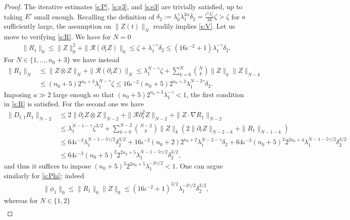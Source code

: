 \documentclass[10pt,a4paper]{amsart}
\begin{document}
\begin{proof}
The iterative estimates \eqref{s:P}, \eqref{s:g3}, and \eqref{s:e3} are trivially satisfied, up to taking $E'$ small enough. 
Recalling the definition of $\delta_2 := \lambda_0^\gamma \lambda_1^{2\alpha} \overline{\delta}_2 = \frac{\iota^2 \lambda_1^\gamma}{16} \zeta > \zeta$ for $a$ sufficiently large, the assumption on $\| Z(t) \|_{N}$ readily implies \eqref{s:V}.
Let us move to verifying \eqref{s:R}. We have for $N=0$
\begin{align}
    \| R_1\|_0 \leq \| Z \|_0^2 + \| \mathcal{R}(\partial_t Z) \|_0 
    \leq
    \zeta + \lambda_1^{-\gamma}\delta_2
    \leq
    (16\iota^{-2}+1)\lambda_1^{-\gamma}\delta_2.
\end{align}
For $N \in \{1,\dots,n_0+3\}$ we have instead
\begin{align}
    \| R_1\|_N &\leq \| Z \otimes Z \|_N + \| \mathcal{R}(\partial_t Z) \|_N
    \leq 
    \lambda_1^{N-\gamma} \zeta + \sum_{k =0}^{N} \binom{N}{k} \| Z \|_k \|Z\|_{N-k}
    \\
    &\leq
    (n_0+5)2^{n_0+3}\lambda_1^{N-\gamma} \zeta
    \leq
    16\iota^{-2}(n_0+5)2^{n_0+3}\lambda_1^{N-2\gamma} \delta_2.
\end{align}
Imposing $a \gg 2$ large enough so that $(n_0+5)2^{n_0+3}\lambda_1^{-\gamma} < 1$, the first condition in \eqref{s:R} is satisfied.
For the second one we have
\begin{align}
\| D_{t,1} R_1 \|_{N-2}
&\leq
2\|\partial_t Z \otimes 
Z\|_{N-2}
+
\| \mathcal{R} \partial_t^2 Z \|_{N-2}
+
\| Z \cdot \nabla R_1 \|_{N-2}
\\
&\leq
\lambda_1^{N-1-\gamma} \zeta^{3/2} +\sum_{k=0}^{N-2} \binom{N-2}{k} \|Z\|_k (2\| \partial_t Z\|_{N-2-k}+\|R_1\|_{N-1-k})
\\
&\leq
64\iota^{-3}\lambda_1^{N-1-5\gamma/2} {\delta}_2^{3/2} 
+ 
16\iota^{-2}(n_0+2)2^{n_0+2} \lambda_1^{N-2-\gamma} {\delta}_2 
+ 
64\iota^{-3}(n_0+5)^2 2^{2n_0+4} \lambda_1^{N-1-5\gamma/2}{\delta}_2^{3/2} 
\\
&\leq
64\iota^{-3}(n_0+5)^2 2^{2n_0+5} \lambda_1^{N-1-5\gamma/2} {\delta}_2^{3/2},
\end{align}
and thus it suffices to impose $(n_0+5)^2 2^{2n_0+5} \lambda_1^{-3\gamma/2} < 1$. 
One can argue similarly for \eqref{s:Phi}; indeed
\begin{align}
  \| \phi_1 \|_0
    \leq  
\| R_1\|_0 \|Z\|_0 \leq
(16\iota^{-2}+1)^{3/2} \lambda_1^{-3\gamma/2} \delta_2^{3/2},
\end{align}
whereas for $N \in \{1,2\}$
\begin{align}

\end{align}
\end{proof}
\end{document}
